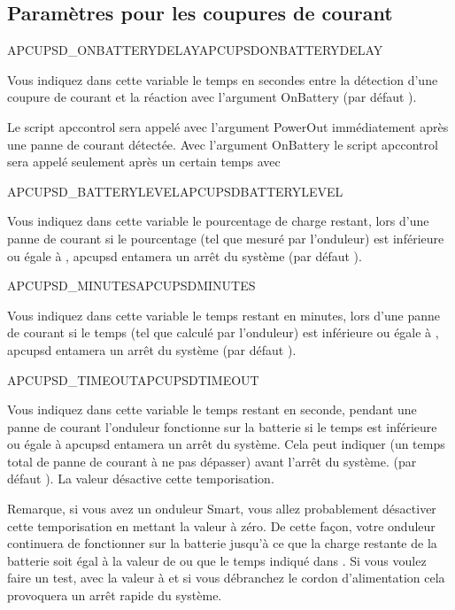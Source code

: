 \subsection{Paramètres pour les coupures de courant}
\begin {description}

 {APCUPSD\_ONBATTERYDELAY}{APCUPSDONBATTERYDELAY}

  Vous indiquez dans cette variable le temps en secondes entre la détection
  d'une coupure de courant et la réaction avec l'argument OnBattery
  (par défaut ).

  Le script apccontrol sera appelé avec l'argument PowerOut immédiatement après
  une panne de courant détectée. Avec l'argument OnBattery le script apccontrol sera
  appelé seulement après un certain temps avec 


 {APCUPSD\_BATTERYLEVEL}{APCUPSDBATTERYLEVEL}

  Vous indiquez dans cette variable le pourcentage de charge restant, lors
  d'une panne de courant si le pourcentage (tel que mesuré par l'onduleur) est
  inférieure ou égale à , apcupsd entamera un
  arrêt du système (par défaut ).


 {APCUPSD\_MINUTES}{APCUPSDMINUTES}

  Vous indiquez dans cette variable le temps restant en minutes, lors
  d'une panne de courant si le temps (tel que calculé par l'onduleur) est
  inférieure ou égale à , apcupsd entamera un
  arrêt du système (par défaut ).


 {APCUPSD\_TIMEOUT}{APCUPSDTIMEOUT}

  Vous indiquez dans cette variable le temps restant en seconde, pendant
  une panne de courant l'onduleur fonctionne sur la batterie si le temps est
  inférieure ou égale à  apcupsd entamera un arrêt du
  système. Cela peut indiquer (un temps total de panne de courant à ne pas
  dépasser) avant l'arrêt du système. (par défaut ).
  La valeur  désactive cette temporisation.

  Remarque, si vous avez un onduleur Smart, vous allez probablement désactiver
  cette temporisation en mettant la valeur à zéro. De cette façon, votre onduleur
  continuera de fonctionner sur la batterie jusqu'à ce que la charge restante
  de la batterie soit égal à la valeur de  ou que le temps
  indiqué dans . Si vous voulez faire un test, avec la valeur
  à  et si vous débranchez le cordon d'alimentation cela provoquera un arrêt
  rapide du système.


\end{description}
